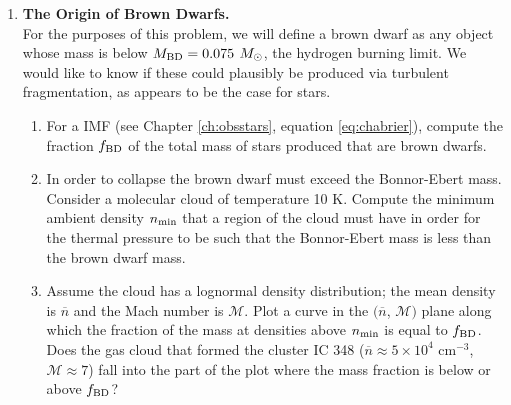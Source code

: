 \begin{enumerate}
\item \textbf{The Origin of Brown Dwarfs.}\\
For the purposes of this problem, we will define a brown dwarf as any object whose mass is below $M_{\rm BD} = 0.075$ $M_{\odot}$, the hydrogen burning limit. We would like to know if these could plausibly be produced via turbulent fragmentation, as appears to be the case for stars.
\begin{enumerate}
\item For a \citet{chabrier05a} IMF (see Chapter \ref{ch:obsstars}, equation \ref{eq:chabrier}), compute the fraction $f_{\rm BD}$ of the total mass of stars produced that are brown dwarfs.
\item In order to collapse the brown dwarf must exceed the Bonnor-Ebert mass. Consider a molecular cloud of temperature 10 K. Compute the minimum ambient density $n_{\rm min}$ that a region of the cloud must have in order for the thermal pressure to be such that the Bonnor-Ebert mass is less than the brown dwarf mass.
\item Assume the cloud has a lognormal density distribution; the mean density is $\overline{n}$ and the Mach number is $\mathcal{M}$. Plot a curve in the $(\overline{n}$, $\mathcal{M})$ plane along which the fraction of the mass at densities above $n_{\rm min}$ is equal to $f_{\rm BD}$. Does the gas cloud that formed the cluster IC 348 ($\overline{n} \approx 5\times 10^4$ cm$^{-3}$, $\mathcal{M}\approx 7$) fall into the part of the plot where the mass fraction is below or above $f_{\rm BD}$?
\end{enumerate}

\end{enumerate}
